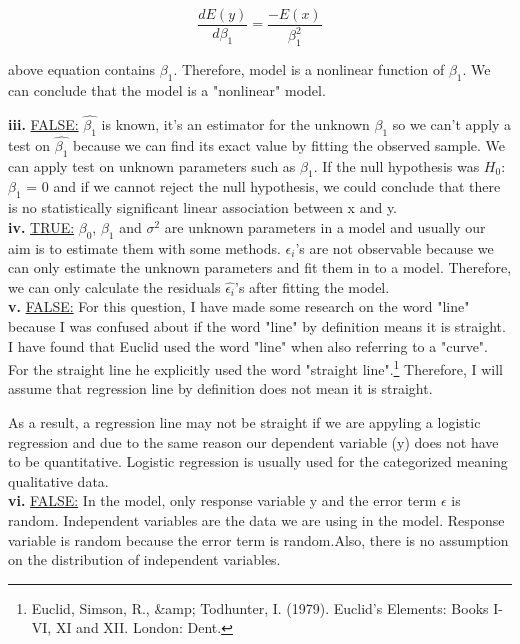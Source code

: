 \documentclass{article}
\begin{document}
\begin{equation}
\frac{dE(y)}{d\beta_1} = \frac{-E(x)}{\beta_1^2}
\end{equation}

above equation contains $\beta_1$. Therefore, model is a nonlinear function of $\beta_1$. We can conclude that the model is a "nonlinear" model.

\newpage

\textbf{iii.} \underline{FALSE:} $\hat{\beta_1}$ is known, it's an estimator for the unknown $\beta_1$ so we can't apply a test on $\hat{\beta_1}$ because we can find its exact value by fitting the observed sample. We can apply test on unknown parameters such as $\beta_1$. If the null hypothesis was $H_0$: $\beta_1$ = 0 and if we cannot reject the null hypothesis, we could conclude that there is no statistically significant linear association between x and y.
\\

\textbf{iv.} \underline{TRUE:} $\beta_0$, $\beta_1$ and $\sigma^2$ are unknown parameters in a model and usually our aim is to estimate them with some methods. $\epsilon_i$'s are not observable because we can only estimate the unknown parameters and fit them in to a model. Therefore, we can only calculate the residuals $\hat{\epsilon_i}$'s after fitting the model. 
\\

\textbf{v.} \underline{FALSE:} For this question, I have made some research on the word "line" because I was confused about if the word "line" by definition means it is straight. I have found that Euclid used the word "line" when also referring to a "curve". For the straight line he explicitly used the word "straight line".\footnote{Euclid, Simson, R., &amp; Todhunter, I. (1979). Euclid's Elements: Books I-VI, XI and XII. London: Dent.} Therefore, I will assume that regression line by definition does not mean it is straight. 

As a result, a regression line may not be straight if we are appyling a logistic regression and due to the same reason our dependent variable (y) does not have to be quantitative. Logistic regression is usually used for the categorized meaning qualitative data.
\\

\textbf{vi.} \underline{FALSE:} In the model, only response variable y and the error term $\epsilon$ is random. Independent variables are the data we are using in the model.
Response variable is random because the error term is random.Also, there is no assumption on the distribution of independent variables. 
\end{document}
